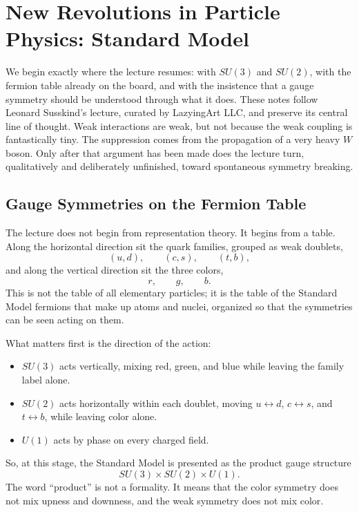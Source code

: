 \chapter{New Revolutions in Particle Physics: Standard Model}

We begin exactly where the lecture resumes: with \(SU(3)\) and \(SU(2)\), with the fermion table already on the board, and with the insistence that a gauge symmetry should be understood through what it does. These notes follow Leonard Susskind's lecture, curated by LazyingArt LLC, and preserve its central line of thought. Weak interactions are weak, but not because the weak coupling is fantastically tiny. The suppression comes from the propagation of a very heavy \(W\) boson. Only after that argument has been made does the lecture turn, qualitatively and deliberately unfinished, toward spontaneous symmetry breaking.

\section{Gauge Symmetries on the Fermion Table}

The lecture does not begin from representation theory. It begins from a table. Along the horizontal direction sit the quark families, grouped as weak doublets,
\[
(u,d),\qquad (c,s),\qquad (t,b),
\]
and along the vertical direction sit the three colors,
\[
r,\qquad g,\qquad b.
\]
This is not the table of all elementary particles; it is the table of the Standard Model fermions that make up atoms and nuclei, organized so that the symmetries can be seen acting on them.

What matters first is the direction of the action:
\begin{itemize}
\item \(SU(3)\) acts vertically, mixing red, green, and blue while leaving the family label alone.
\item \(SU(2)\) acts horizontally within each doublet, moving \(u\leftrightarrow d\), \(c\leftrightarrow s\), and \(t\leftrightarrow b\), while leaving color alone.
\item \(U(1)\) acts by phase on every charged field.
\end{itemize}

So, at this stage, the Standard Model is presented as the product gauge structure
\begin{equation}
SU(3)\times SU(2)\times U(1).
\end{equation}
The word ``product'' is not a formality. It means that the color symmetry does not mix upness and downness, and the weak symmetry does not mix color.

